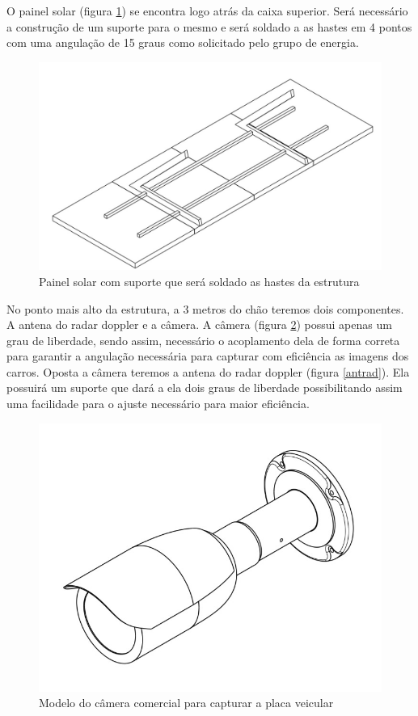 O painel solar (figura \ref{painelsol}) se encontra logo atrás da caixa superior. Será necessário a construção de um suporte para o mesmo e será soldado a as hastes em 4 pontos com uma angulação de 15 graus como solicitado pelo grupo de energia. 

\begin{figure}[H]
	\centering
    \includegraphics[keepaspectratio=true,scale=0.3]{figuras/painelcomsup.jpeg}
    \caption{Painel solar com suporte que será soldado as hastes da estrutura}
    \label{painelsol}
\end{figure}

No ponto mais alto da estrutura, a 3 metros do chão teremos dois componentes. A antena do radar doppler e a câmera. A câmera (figura \ref{camera}) possui apenas um grau de liberdade, sendo assim, necessário o acoplamento dela de forma correta para garantir a angulação necessária para capturar com eficiência as imagens dos carros. Oposta a câmera teremos a antena do radar doppler (figura \ref{antrad}). Ela possuirá um suporte que dará a ela dois graus de liberdade possibilitando assim uma facilidade para o ajuste necessário para maior eficiência. 

\begin{figure}[H]
	\centering
    \includegraphics[keepaspectratio=true,scale=0.3]{figuras/camera.jpeg}
    \caption{Modelo do câmera comercial para capturar a placa veicular}
    \label{camera}
\end{figure}

